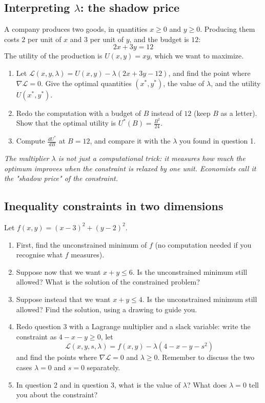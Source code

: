 \documentclass[]{article}
\begin{document}
	\subsection{Interpreting $\lambda$: the shadow price}
	A company produces two goods, in quantities $x \geq 0$ and $y \geq 0$.
	Producing them costs $2$ per unit of $x$ and $3$ per unit of $y$, and the budget is $12$:
	$$2x + 3y = 12$$
	The utility of the production is $U(x,y) = xy$, which we want to maximize.

	\begin{enumerate}
		\item Let $\mathcal{L}(x,y,\lambda) = U(x,y) - \lambda(2x + 3y - 12)$, and find the point where $\nabla \mathcal{L} = 0$.
		Give the optimal quantities $(x^*, y^*)$, the value of $\lambda$, and the utility $U(x^*,y^*)$.
		\item Redo the computation with a budget of $B$ instead of $12$ (keep $B$ as a letter).
		Show that the optimal utility is $U^*(B) = \frac{B^2}{24}$.
		\item Compute $\frac{d U^*}{d B}$ at $B = 12$, and compare it with the $\lambda$ you found in question 1.
	\end{enumerate}
	\textit{The multiplier $\lambda$ is not just a computational trick: it measures how much the optimum improves when the constraint is relaxed by one unit.
	Economists call it the "shadow price" of the constraint.}

	\subsection{Inequality constraints in two dimensions}
	Let $f(x,y) = (x-3)^2 + (y-2)^2$.

	\begin{enumerate}
		\item First, find the unconstrained minimum of $f$ (no computation needed if you recognise what $f$ measures).
		\item Suppose now that we want $x + y \leq 6$.
		Is the unconstrained minimum still allowed?
		What is the solution of the constrained problem?
		\item Suppose instead that we want $x + y \leq 4$.
		Is the unconstrained minimum still allowed?
		Find the solution, using a drawing to guide you.
		\item Redo question 3 with a Lagrange multiplier and a slack variable:
		write the constraint as $4 - x - y \geq 0$, let
		$$\mathcal{L}(x,y,s,\lambda) = f(x,y) - \lambda(4 - x - y - s^2)$$
		and find the points where $\nabla \mathcal{L} = 0$ and $\lambda \geq 0$.
		Remember to discuss the two cases $\lambda = 0$ and $s = 0$ separately.
		\item In question 2 and in question 3, what is the value of $\lambda$?
		What does $\lambda = 0$ tell you about the constraint?
	\end{enumerate}
\end{document}
